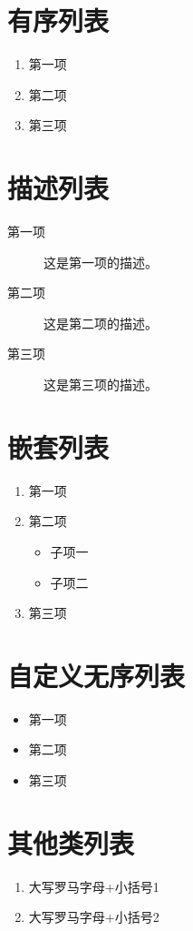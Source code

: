 \section*{有序列表}
\begin{enumerate}
	\item 第一项
	\item 第二项
	\item 第三项
\end{enumerate}

\section*{描述列表}
\begin{description}
	\item[第一项] 这是第一项的描述。
	\item[第二项] 这是第二项的描述。
	\item[第三项] 这是第三项的描述。
\end{description}

\section*{嵌套列表}
\begin{enumerate}
	\item 第一项
	\item 第二项
	\begin{itemize}
		\item 子项一
		\item 子项二
	\end{itemize}
	\item 第三项
\end{enumerate}

\section*{自定义无序列表}
\begin{itemize}[label=\textbullet] %
	\item 第一项
	\item 第二项
	\item 第三项
\end{itemize}


\section*{其他类列表}
\begin{enumerate}[label=(\Roman*)]
	\item 大写罗马字母+小括号1
	\item 大写罗马字母+小括号2 
\end{enumerate}

